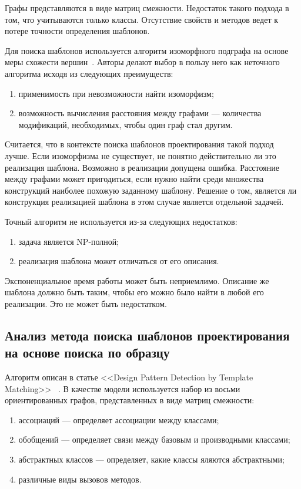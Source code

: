 Графы представляются в виде матриц смежности.
Недостаток такого подхода в том, что учитываются только классы.
Отсутствие свойств и методов ведет к потере точности определения шаблонов.

Для поиска шаблонов используется алгоритм изоморфного подграфа на основе меры
схожести вершин~\cite{SimilarityGraphVertices}.
Авторы делают выбор в пользу него как неточного алгоритма исходя из следующих
преимуществ:
\begin{enumerate}
\item применимость при невозможности найти изоморфизм;
\item возможность вычисления расстояния между графами --- количества модификаций,
необходимых, чтобы один граф стал другим.
\end{enumerate}

Считается, что в контексте поиска шаблонов проектирования такой подход лучше.
Если изоморфизма не существует, не понятно действительно ли это реализация шаблона.
Возможно в реализации допущена ошибка.
Расстояние между графами может пригодиться, если нужно найти среди множества
конструкций наиболее похожую заданному шаблону.
Решение о том, является ли конструкция реализацией шаблона в этом случае является
отдельной задачей.

Точный алгоритм не используется из-за следующих недостатков:
\begin{enumerate}
\item задача является NP-полной;
\item реализация шаблона может отличаться от его описания.
\end{enumerate}

Экспоненциальное время работы может быть неприемлимо.
Описание же шаблона должно быть таким, чтобы его можно было найти в любой его
реализации. Это не может быть недостатком.

\subsection{Анализ метода поиска шаблонов проектирования на основе поиска по образцу}

Алгоритм описан в статье <<Design Pattern Detection by Template Matching>>
~\cite{DesignPatternTemplateMatching}.
В качестве модели используется набор из восьми ориентированных графов,
представленных в виде матриц смежности:
\begin{enumerate}
\item ассоциаций --- определяет ассоциации между классами;
\item обобщений --- определяет связи между базовым и производными классами;
\item абстрактных классов --- определяет, какие классы яляются абстрактными;
\item различные виды вызовов методов.
\end{enumerate}


